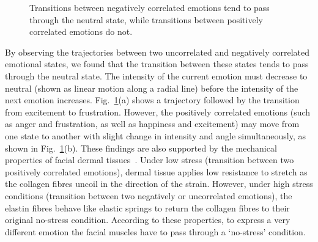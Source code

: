 \documentclass[10pt,journal,cspaper,compsoc]{IEEEtran}
\begin{document}
\begin{figure}[!htp]
\begin{center}
\end{center}
\caption{Transitions between negatively correlated emotions tend to pass through the neutral state, while transitions between positively correlated emotions do not.}
\label{fig_e1_to_e2}
\end{figure}

By observing the trajectories between two uncorrelated and negatively correlated emotional states, we found that the transition between these states tends to pass through the neutral state. The intensity of the current emotion must decrease to neutral (shown as linear motion along a radial line) before the intensity of the next emotion increases. Fig.~\ref{fig_e1_to_e2}(a) shows a trajectory followed by the transition from excitement to frustration. However, the positively correlated emotions (such as anger and frustration, as well as happiness and excitement) may move from one state to another with slight change in intensity and angle simultaneously, as shown in Fig.~\ref{fig_e1_to_e2}(b). These findings are also supported by the mechanical properties of facial dermal tissues~\cite{terzopoulos1990physically}. Under low stress (transition between two positively correlated emotions), dermal tissue applies low resistance to stretch as the collagen fibres uncoil in the direction of the strain. However, under high stress conditions (transition between two negatively or uncorrelated emotions), the elastin fibres behave like elastic springs to return the collagen fibres to their original no-stress condition. According to these properties, to express a very different emotion the facial muscles have to pass through a `no-stress' condition.
\end{document}

